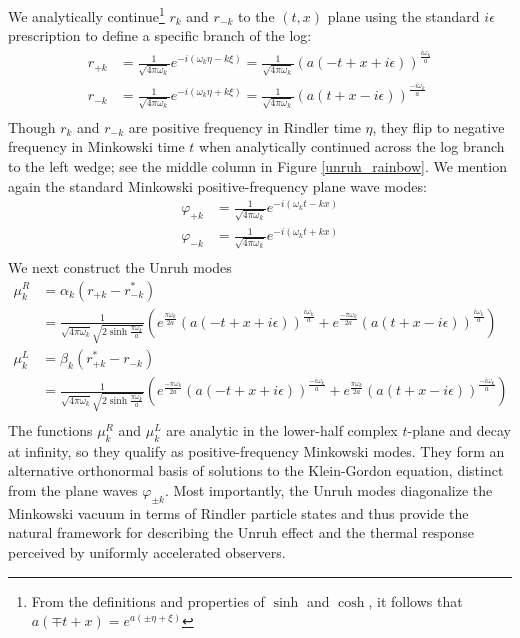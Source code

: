 \documentclass[12pt,a4paper]{article}
\begin{document}
We analytically continue\footnote{From the definitions and properties of $\sinh$ and $\cosh$, it follows that $a(\mp t + x) = e^{a(\pm \eta + \xi)}$}  $r_k$ and $r_{-k}$ to the $(t,x)$ plane using the standard $i\epsilon$ prescription to define a specific branch of the log:
\begin{equation}
  \begin{aligned}
    r_{+k} &= \frac{1}{\sqrt{4 \pi \omega_k}} e^{-i(\omega_k \eta - k \xi)} = \frac{1}{\sqrt{4 \pi \omega_k}} (a(-t + x + i \epsilon))^{\frac{i \omega_k}{a}} \\
    r_{-k} &= \frac{1}{\sqrt{4 \pi \omega_k}} e^{-i(\omega_k \eta + k \xi)} = \frac{1}{\sqrt{4 \pi \omega_k}} (a( t + x - i \epsilon))^{\frac{-i \omega_k}{a}} \\
  \end{aligned}
\end{equation}
Though $r_k$ and $r_{-k}$ are positive frequency in Rindler time $\eta$, they flip to negative frequency in Minkowski time $t$ when analytically continued across the log branch to the left wedge; see the middle column in Figure \ref{unruh_rainbow}. We mention again the standard Minkowski positive-frequency plane wave modes:
\begin{equation}
  \begin{aligned}
    \varphi_{+k} &= \frac{1}{\sqrt{4 \pi \omega_k}} e^{-i(\omega_k t - k x)}\\
    \varphi_{-k} &= \frac{1}{\sqrt{4 \pi \omega_k}} e^{-i(\omega_k t + k x)}\\
  \end{aligned}
\end{equation}
We next construct the Unruh modes
\begin{equation}
  \begin{aligned}
    \mu^R_k &= \alpha_k (r_{+k} - r_{-k}^*) \\
    &= \frac{1}{\sqrt{4 \pi \omega_k}\sqrt{2 \sinh \frac{\pi \omega_k}{a}}} \left( e^{\frac{\pi \omega_k}{2a}} \left(a(-t+x+i\epsilon)\right)^{\frac{i\omega_k}{a}} + e^{\frac{-\pi \omega_k}{2a}} \left(a(t+x-i\epsilon)\right)^{\frac{i\omega_k}{a}} \right) \\
    \mu^L_k &= \beta_k (r_{+k}^* - r_{-k} )  \\
    &=\frac{1}{\sqrt{4 \pi \omega_k}\sqrt{2 \sinh \frac{\pi \omega_k}{a}}} \left( e^{\frac{-\pi \omega_k}{2a}} \left(a(-t+x+i\epsilon)\right)^{\frac{-i\omega_k}{a}} + e^{\frac{\pi \omega_k}{2a}} \left(a(t+x-i\epsilon)\right)^{\frac{-i\omega_k}{a}} \right) \\
  \end{aligned}
\end{equation}
The functions $\mu^R_k$ and $\mu^L_k$ are analytic in the lower-half complex $t$-plane and decay at infinity, so they qualify as positive-frequency Minkowski modes. They form an alternative orthonormal basis of solutions to the Klein-Gordon equation, distinct from the plane waves $\varphi_{\pm k}$. Most importantly, the Unruh modes diagonalize the Minkowski vacuum in terms of Rindler particle states and thus provide the natural framework for describing the Unruh effect and the thermal response perceived by uniformly accelerated observers.
\end{document}
